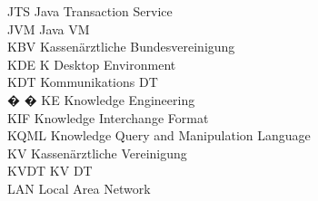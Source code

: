 \begin{tabbing}
    \>JTS \>\>Java Transaction Service\\

    \>JVM \>\>Java VM\\

    \>KBV \>\>Kassen\"{a}rztliche Bundesvereinigung\\

    \>KDE \>\>K Desktop Environment\\

    \>KDT \>\>Kommunikations DT\\

� � \>KE \>\>Knowledge Engineering\\




    \>KIF \>\>Knowledge Interchange Format\\



    \>KQML \>\>Knowledge Query and Manipulation Language\\

    \>KV \>\>Kassen\"{a}rztliche Vereinigung\\

    \>KVDT \>\>KV DT\\




    \>LAN \>\>Local Area Network\\





\end{tabbing}
